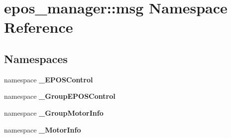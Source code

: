 \section{epos\-\_\-manager\-:\-:msg \-Namespace \-Reference}
\label{namespaceepos__manager_1_1msg}
\subsection*{\-Namespaces}
\begin{DoxyCompactItemize}
\item 
namespace {\bf \-\_\-\-E\-P\-O\-S\-Control}
\item 
namespace {\bf \-\_\-\-Group\-E\-P\-O\-S\-Control}
\item 
namespace {\bf \-\_\-\-Group\-Motor\-Info}
\item 
namespace {\bf \-\_\-\-Motor\-Info}
\end{DoxyCompactItemize}
